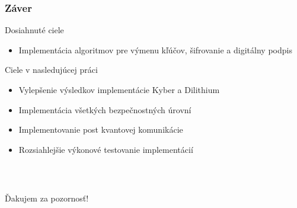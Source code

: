 \documentclass[%
  14pt,       				%
	t,                  %
	aspectratio=1610,   %
	unicode,						%
]{beamer}				    	%
\begin{document}
\begin{frame}[c]
	\frametitle{Záver}
	\large{
		Dosiahnuté ciele
		\begin{itemize}
			\item Implementácia algoritmov pre výmenu kľúčov, šifrovanie a digitálny podpis
		\end{itemize}
		Ciele v nasledujúcej práci
		\begin{itemize}
			\item Vylepšenie výsledkov implementácie Kyber a Dilithium
			\item Implementácia všetkých bezpečnostných úrovní
			\item Implementovanie post kvantovej komunikácie
			\item Rozsiahlejšie výkonové testovanie implementácií
		\end{itemize}
	}
	
\end{frame}

\begin{frame}[c]
	\frametitle{\mbox{ }}
	\begin{center}
		{\Huge Ďakujem za pozornosť!}
	\end{center}
\end{frame}

\end{document}
